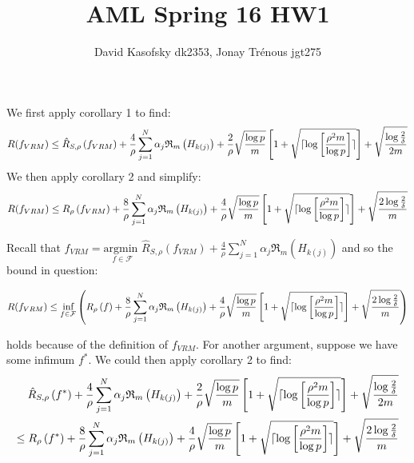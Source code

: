 \documentclass[]{article}
\title{AML Spring 16 HW1}
\author{David Kasofsky dk2353, Jonay Tr\'enous jgt275}
\begin{document}
\maketitle

\section{}

We first apply corollary 1 to find:
\begin{equation}
	R(f_{VRM}) \le \hat{R}_{S,\rho}\left(f_{VRM}\right) + \frac{4}{\rho} \sum_{j=1}^{N} \alpha_j \mathfrak{R}_m \left( H_{k \left( j \right)} \right) + \frac{2}{\rho} \sqrt{\frac{\log p}{m}} \left[1+\sqrt{\lceil \log \left[ \frac{\rho^2 m}{\log p} \right]\rceil}\right] + \sqrt{\frac{\log \frac{2}{\delta}}{2m}}
\notag
\end{equation}
We then apply corollary 2 and simplify:
\begin{equation}
	R(f_{VRM}) \le R_\rho\left(f_{VRM}\right) + \frac{8}{\rho} \sum_{j=1}^{N} \alpha_j \mathfrak{R}_m \left( H_{k \left( j \right)} \right) + \frac{4}{\rho} \sqrt{\frac{\log p}{m}} \left[1+\sqrt{\lceil \log \left[ \frac{\rho^2 m}{\log p} \right]\rceil}\right] + \sqrt{\frac{2\log \frac{2}{\delta}}{m}}
\notag
\end{equation}

\noindent Recall that $f_{VRM} = \underset{f \in \mathcal{F}}{\text{argmin }} \hat{R}_{S,\rho}\left(f_{VRM}\right) + \frac{4}{\rho} \sum_{j=1}^{N} \alpha_j \mathfrak{R}_m \left( H_{k \left( j \right)} \right)$ and so the bound in question:

\begin{equation}
	R(f_{VRM}) \le \underset{f \in \mathcal{F}}{\text{inf}}\left(R_\rho\left(f\right) + \frac{8}{\rho} \sum_{j=1}^{N} \alpha_j \mathfrak{R}_m \left( H_{k \left( j \right)} \right) + \frac{4}{\rho} \sqrt{\frac{\log p}{m}} \left[1+\sqrt{\lceil \log \left[ \frac{\rho^2 m}{\log p} \right]\rceil}\right] + \sqrt{\frac{2\log \frac{2}{\delta}}{m}}\right)
\notag
\end{equation}

\noindent holds because of the definition of $f_{VRM}$. For another argument, suppose we have some infimum $f^*$. We could then apply corollary 2 to find:
\begin{equation}
\begin{split}
	\hat{R}_{S,\rho}\left(f^*\right) + \frac{4}{\rho} \sum_{j=1}^{N} \alpha_j \mathfrak{R}_m \left( H_{k \left( j \right)} \right) + \frac{2}{\rho} \sqrt{\frac{\log p}{m}} \left[1+\sqrt{\lceil \log \left[ \frac{\rho^2 m}{\log p} \right]\rceil}\right] + \sqrt{\frac{\log \frac{2}{\delta}}{2m}} \\
	\le R_{\rho}\left(f^*\right) + \frac{8}{\rho} \sum_{j=1}^{N} \alpha_j \mathfrak{R}_m \left( H_{k \left( j \right)} \right) + \frac{4}{\rho} \sqrt{\frac{\log p}{m}} \left[1+\sqrt{\lceil \log \left[ \frac{\rho^2 m}{\log p} \right]\rceil}\right] + \sqrt{\frac{2\log \frac{2}{\delta}}{m}}
\end{split}
\notag
\end{equation}
\end{document}
